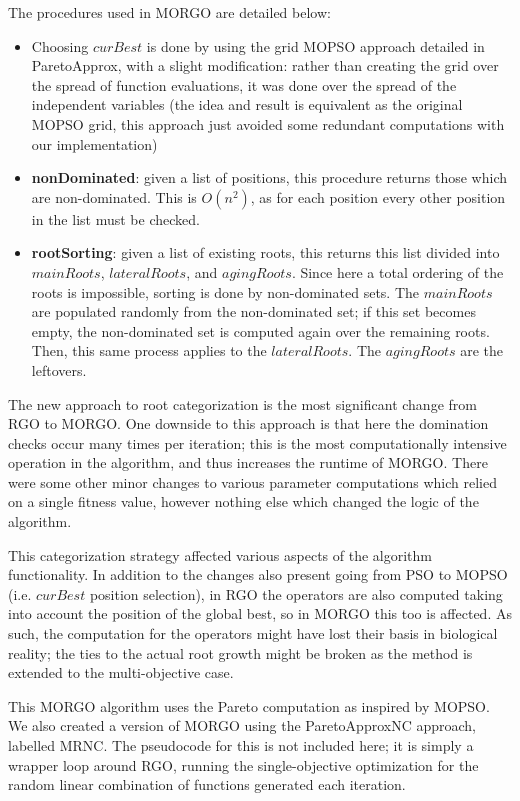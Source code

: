 \documentclass[letterpaper, 10 pt, conference]{ieeeconf}  %
\begin{document}
The procedures used in MORGO are detailed below:
\begin{itemize}
\item Choosing $curBest$ is done by using the grid MOPSO approach detailed in ParetoApprox, with a slight modification: rather than creating the grid over the spread of function evaluations, it was done over the spread of the independent variables (the idea and result is equivalent as the original MOPSO grid, this approach just avoided some redundant computations with our implementation)
\item \textbf{nonDominated}: given a list of positions, this procedure returns those which are non-dominated.  This is ${O(n^2)}$, as for each position every other position in the list must be checked.
\item \textbf{rootSorting}: given a list of existing roots, this returns this list divided into $mainRoots$, $lateralRoots$, and $agingRoots$.  Since here a total ordering of the roots is impossible, sorting is done by non-dominated sets.  The $mainRoots$ are populated randomly from the non-dominated set; if this set becomes empty, the non-dominated set is computed again over the remaining roots.  Then, this same process applies to the $lateralRoots$.  The $agingRoots$ are the leftovers.
\end{itemize}

The new approach to root categorization is the most significant change from RGO to MORGO.  One downside to this approach is that here the domination checks occur many times per iteration; this is the most computationally intensive operation in the algorithm, and thus increases the runtime of MORGO.  There were some other minor changes to various parameter computations which relied on a single fitness value, however nothing else which changed the logic of the algorithm.  

This categorization strategy affected various aspects of the algorithm functionality.  In addition to the changes also present going from PSO to MOPSO (i.e. $curBest$ position selection), in RGO the operators are also computed taking into account the position of the global best, so in MORGO this too is affected.  As such, the computation for the operators might have lost their basis in biological reality; the ties to the actual root growth might be broken as the method is extended to the multi-objective case.  

This MORGO algorithm uses the Pareto computation as inspired by MOPSO.  We also created a version of MORGO using the ParetoApproxNC approach, labelled MRNC.  The pseudocode for this is not included here; it is simply a wrapper loop around RGO, running the single-objective optimization for the random linear combination of functions generated each iteration.    
\end{document}
